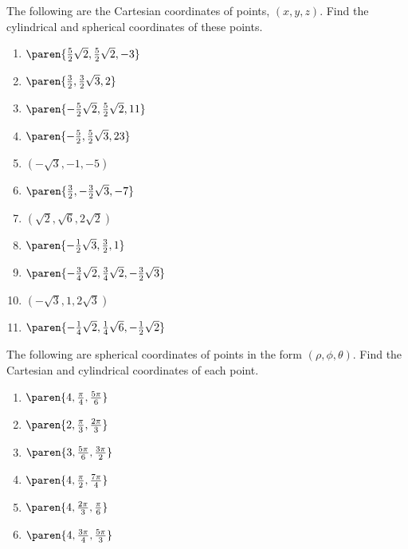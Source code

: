 \begin{ex} The following are the Cartesian coordinates of points, $(
x,y,z)$. Find the cylindrical and spherical coordinates of these
points.

\begin{enumerate}
\item $\paren{\frac{5}{2}\sqrt{2},\frac{5}{2}\sqrt{2},-3} $

\item $\paren{\frac{3}{2},\frac{3}{2}\sqrt{3},2} $

\item $\paren{-\frac{5}{2}\sqrt{2},\frac{5}{2}\sqrt{2},11} $

\item $\paren{-\frac{5}{2},\frac{5}{2}\sqrt{3},23} $

\item $(-\sqrt{3},-1,-5) $

\item $\paren{\frac{3}{2},-\frac{3}{2}\sqrt{3},-7} $

\item $(\sqrt{2},\sqrt{6},2\sqrt{2}) $

\item $\paren{-\frac{1}{2}\sqrt{3},\frac{3}{2},1} $

\item $\paren{-\frac{3}{4}\sqrt{2},\frac{3}{4}\sqrt{2},-\frac{3}{2}\sqrt{3}} $

\item $(-\sqrt{3},1,2\sqrt{3}) $

\item $\paren{-\frac{1}{4}\sqrt{2},\frac{1}{4}\sqrt{6},-\frac{1}{2}\sqrt{2}} $
\end{enumerate}
\end{ex}

\begin{ex}
The following are spherical coordinates of points in the form $(
\rho,\phi,\theta)$. Find the Cartesian and cylindrical
coordinates of each point.

\begin{enumerate}
\item $\paren{4,\frac{\pi }{4},\frac{5\pi }{6}} $

\item $\paren{2,\frac{\pi }{3},\frac{2\pi }{3}} $

\item $\paren{3,\frac{5\pi }{6},\frac{3\pi }{2}} $

\item $\paren{4,\frac{\pi }{2},\frac{7\pi }{4}} $

\item $\paren{4,\frac{2\pi }{3},\frac{\pi }{6}} $

\item $\paren{4,\frac{3\pi }{4},\frac{5\pi }{3}} $
\end{enumerate}
\end{ex}

